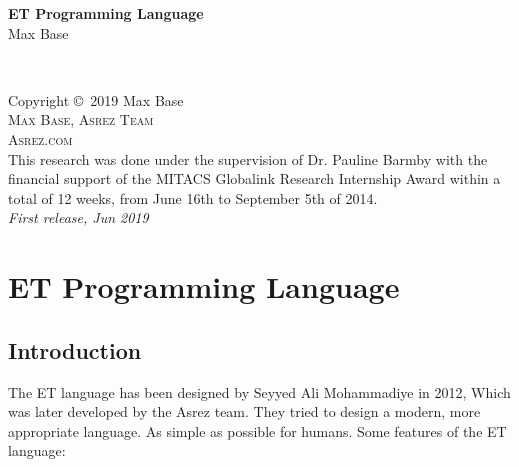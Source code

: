 \documentclass[11pt,fleqn]{book}
\begin{document}
\begingroup
\thispagestyle{empty}
 \centering
\vspace*{5cm}
\par\normalfont\fontsize{35}{35}\sffamily\selectfont
\textbf{ET Programming Language}\\
\vspace*{1cm}
{\Huge Max Base}\par
\endgroup
\newpage
~\vfill
\thispagestyle{empty}

\noindent Copyright \copyright\ 2019 Max Base\\ 

\noindent \textsc{Max Base, Asrez Team}\\
\noindent \textsc{Asrez.com}\\

\noindent This research was done under the supervision of Dr. Pauline Barmby with the financial support of the MITACS Globalink Research Internship Award within a total of 12 weeks, from June 16th to September 5th of 2014.\\

\noindent \textit{First release, Jun 2019}
\pagestyle{empty}
\tableofcontents
\pagestyle{fancy}
\chapter{ET Programming Language}
\section{Introduction}

The ET language has been designed by Seyyed Ali Mohammadiye in 2012, Which was later
developed by the Asrez team. They tried to design a modern, more appropriate language. As
simple as possible for humans.
Some features of the ET language:
\end{document}
